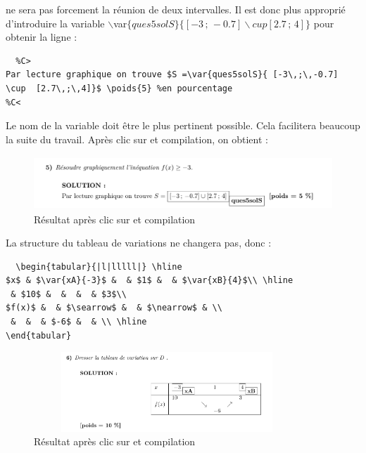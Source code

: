 {\begin{description}
 ne sera pas forcement la réunion de deux intervalles. Il est donc plus approprié d'introduire la variable  $\backslash$var$\{ques5solS\}\{ [-3\,;\,-0.7] \backslash cup  [2.7\,;\,4]\}$ 
 pour obtenir la ligne :
 \begin{verbatim}
  %C>
Par lecture graphique on trouve $S =\var{ques5solS}{ [-3\,;\,-0.7] \cup  [2.7\,;\,4]}$ \poids{5} %en pourcentage
%C<
 \end{verbatim}
 Le nom de la variable doit être le plus pertinent possible. Cela facilitera beaucoup la suite du travail. 
 Après  clic sur  et compilation, on obtient :
  \begin{figure}[h]
 \centering
 \includegraphics[width=15cm,height=2cm]{./images/creation_exercice_var_03b.png}
 \caption{Résultat après  clic sur  et compilation}
 \label{fig: var 03b}
\end{figure}
 \item[Action pour le c) : ] La structure du tableau de variations ne changera pas, donc :
 \begin{verbatim}
  \begin{tabular}{|l|lllll|} \hline
$x$ & $\var{xA}{-3}$ &  & $1$ &  & $\var{xB}{4}$\\ \hline
 & $10$ &  &  &  & $3$\\ 
$f(x)$ &  & $\searrow$ &  & $\nearrow$ & \\
 &  &  & $-6$ &  & \\ \hline
\end{tabular}
 \end{verbatim}
  \begin{figure}[h]
 \centering
 \includegraphics[width=10cm,height=3cm]{./images/creation_exercice_var_03c.png}
 \caption{Résultat après  clic sur  et compilation}
 \label{fig: var 03c}
\end{figure}


\end{description}}

